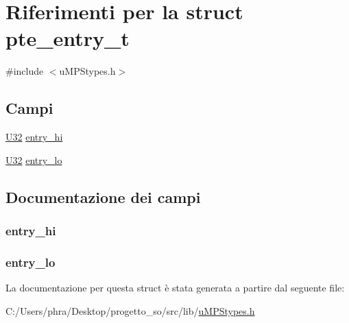 \hypertarget{structpte__entry__t}{\section{Riferimenti per la struct pte\-\_\-entry\-\_\-t}
\label{structpte__entry__t}
}


{\ttfamily \#include $<$u\-M\-P\-Stypes.\-h$>$}

\subsection*{Campi}
\begin{DoxyCompactItemize}
\item 
\hyperlink{base_8h_ac3df7cf3c8cb172a588adec881447d68}{U32} \hyperlink{structpte__entry__t_a867e8a3789b0868e6fe3cb734b8d7e34}{entry\-\_\-hi}
\item 
\hyperlink{base_8h_ac3df7cf3c8cb172a588adec881447d68}{U32} \hyperlink{structpte__entry__t_afe028ede8677834da78a88fb7257be4e}{entry\-\_\-lo}
\end{DoxyCompactItemize}


\subsection{Documentazione dei campi}
\hypertarget{structpte__entry__t_a867e8a3789b0868e6fe3cb734b8d7e34}{
\subsubsection[{entry\-\_\-hi}]{ entry\-\_\-hi}}\label{structpte__entry__t_a867e8a3789b0868e6fe3cb734b8d7e34}
\hypertarget{structpte__entry__t_afe028ede8677834da78a88fb7257be4e}{
\subsubsection[{entry\-\_\-lo}]{ entry\-\_\-lo}}\label{structpte__entry__t_afe028ede8677834da78a88fb7257be4e}


La documentazione per questa struct è stata generata a partire dal seguente file\-:\begin{DoxyCompactItemize}
\item 
C\-:/\-Users/phra/\-Desktop/progetto\-\_\-so/src/lib/\hyperlink{u_m_p_stypes_8h}{u\-M\-P\-Stypes.\-h}\end{DoxyCompactItemize}
